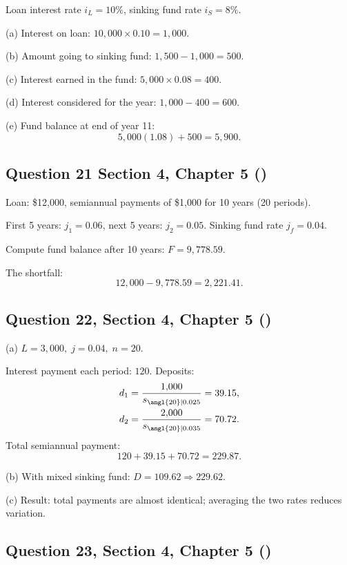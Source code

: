 \documentclass[12pt, a4paper]{article}
\begin{document}
Loan interest rate \( i_L = 10\% \), sinking fund rate \( i_S = 8\%. \)

(a) Interest on loan: \(10{,}000 \times 0.10 = 1{,}000.\)

(b) Amount going to sinking fund: \(1{,}500 - 1{,}000 = 500.\)

(c) Interest earned in the fund: \(5{,}000 \times 0.08 = 400.\)

(d) Interest considered for the year: \(1{,}000 - 400 = 600.\)

(e) Fund balance at end of year 11:
\[
5{,}000(1.08) + 500 = 5{,}900.
\]

\subsection*{Question 21 Section 4, Chapter 5  (\cite{toi3rd})}

Loan: \$12{,}000, semiannual payments of \$1{,}000 for 10 years (20 periods).

First 5 years: \(j_1 = 0.06\), next 5 years: \(j_2 = 0.05\).  
Sinking fund rate \(j_f = 0.04.\)

Compute fund balance after 10 years: \(F = 9{,}778.59.\)

The shortfall:
\[
12{,}000 - 9{,}778.59 = 2{,}221.41.
\]

\subsection*{Question 22, Section 4, Chapter 5  (\cite{toi3rd})}

(a) \( L = 3{,}000, \; j = 0.04, \; n = 20. \)

Interest payment each period: \(120.\)
Deposits:
\[
\begin{aligned}
d_1 &= \frac{1{,}000}{s_{\angl{20}|0.025}} = 39.15,\\
d_2 &= \frac{2{,}000}{s_{\angl{20}|0.035}} = 70.72.
\end{aligned}
\]
Total semiannual payment:
\[
120 + 39.15 + 70.72 = 229.87.
\]

(b) With mixed sinking fund: \(D = 109.62 \Rightarrow 229.62.\)

(c) Result: total payments are almost identical; averaging the two rates reduces variation.

\subsection*{Question 23, Section 4, Chapter 5  (\cite{toi3rd})}
\end{document}
